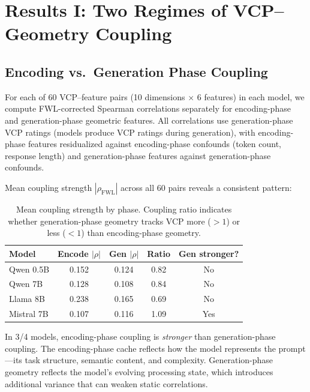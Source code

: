 \documentclass[11pt,a4paper]{article}
\begin{document}
\section{Results I: Two Regimes of VCP--Geometry Coupling}

\subsection{Encoding vs.\ Generation Phase Coupling}

For each of 60 VCP--feature pairs (10 dimensions $\times$ 6 features) in each model, we compute FWL-corrected Spearman correlations separately for encoding-phase and generation-phase geometric features. All correlations use generation-phase VCP ratings (models produce VCP ratings during generation), with encoding-phase features residualized against encoding-phase confounds (token count, response length) and generation-phase features against generation-phase confounds.

Mean coupling strength $|\rho_{\text{FWL}}|$ across all 60 pairs reveals a consistent pattern:

\begin{table}[H]
\centering
\caption{Mean coupling strength by phase. Coupling ratio indicates whether generation-phase geometry tracks VCP more ($>1$) or less ($<1$) than encoding-phase geometry.}
\label{tab:coupling_strength}
\begin{tabular}{lcccc}
\toprule
\textbf{Model} & \textbf{Encode $|\rho|$} & \textbf{Gen $|\rho|$} & \textbf{Ratio} & \textbf{Gen stronger?} \\
\midrule
Qwen 0.5B  & 0.152 & 0.124 & 0.82 & No  \\
Qwen 7B    & 0.128 & 0.108 & 0.84 & No  \\
Llama 8B   & 0.238 & 0.165 & 0.69 & No  \\
Mistral 7B & 0.107 & 0.116 & 1.09 & Yes \\
\bottomrule
\end{tabular}
\end{table}

In 3/4 models, encoding-phase coupling is \emph{stronger} than generation-phase coupling. The encoding-phase cache reflects how the model represents the prompt---its task structure, semantic content, and complexity. Generation-phase geometry reflects the model's evolving processing state, which introduces additional variance that can weaken static correlations.
\end{document}
